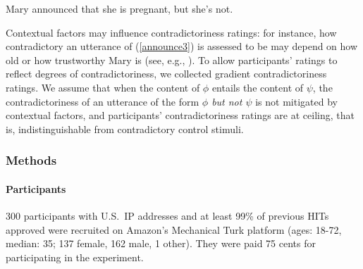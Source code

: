 \documentclass[11pt,fleqn]{article}
\newcommand{\6}{\mbox{$[\hspace*{-.6mm}[$}}
\newcommand{\9}{\mbox{$]\hspace*{-.6mm}]$}}
\begin{document}
\begin{exe}
\ex\label{announce3} Mary announced that she is pregnant, but she's not.
\end{exe}
Contextual factors may influence contradictoriness ratings: for instance, how contradictory an utterance of (\ref{announce3}) is assessed to be may depend on how old or how trustworthy Mary is (see, e.g., \citealt{schlenker10,demarneffe-etal2012}). To allow participants' ratings to reflect degrees of contradictoriness, we collected gradient contradictoriness ratings. We assume that when the content of $\phi$ entails the content of $\psi$, the contradictoriness of an utterance of the form {\em $\phi$ but not $\psi$} is not mitigated by contextual factors, and participants' contradictoriness ratings are at ceiling, that is, indistinguishable from contradictory control stimuli.

\subsubsection{Methods}

\paragraph{Participants} 300 participants with U.S.\ IP addresses and at least 99\% of previous HITs approved were recruited on Amazon's Mechanical Turk platform (ages: 18-72, median: 35; 137 female, 162 male, 1 other). They were paid 75 cents for participating in the experiment.
\end{document}
